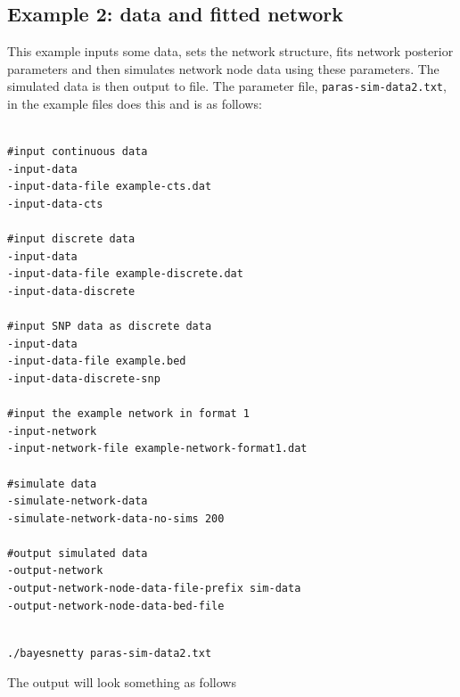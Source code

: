 \documentclass[a4paper,12pt]{article}
\newcommand{\code}[1]{{\footnotesize{{\tt #1}}}}
\begin{document}

\subsection{Example 2: data and fitted network}
\label{sim-data-example2}

This example inputs some data, sets the network structure, fits network posterior parameters and then simulates network node data using these parameters. The simulated data is then output to file. The parameter file, \code{paras-sim-data2.txt}, in the example files does this and is as follows: 
\vspace{0.35cm} \begin{lstlisting}

#input continuous data
-input-data
-input-data-file example-cts.dat
-input-data-cts

#input discrete data
-input-data
-input-data-file example-discrete.dat
-input-data-discrete

#input SNP data as discrete data
-input-data
-input-data-file example.bed
-input-data-discrete-snp

#input the example network in format 1
-input-network
-input-network-file example-network-format1.dat

#simulate data
-simulate-network-data
-simulate-network-data-no-sims 200

#output simulated data
-output-network
-output-network-node-data-file-prefix sim-data
-output-network-node-data-bed-file

\end{lstlisting} \vspace{0.35cm}\vspace{0.35cm} \begin{lstlisting}

./bayesnetty paras-sim-data2.txt

\end{lstlisting} \vspace{0.35cm}
The output will look something as follows 
\end{document}

